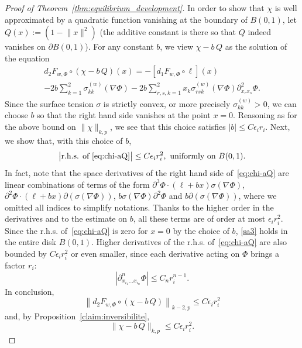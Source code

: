 \documentclass[AHL,Unicode,longabstracts,published]{cedram}
\newcommand{\norm}[1]{\lVert #1 \rVert}
\newcommand{\abs}[1]{\lvert #1 \rvert}
\newcommand{\eps}{\epsilon}
\begin{document}
\begin{proof}[Proof of Theorem~\ref{thm:equilibrium_development}]
In order to show that $\chi$ is well approximated by a quadratic function vanishing at the boundary of $B(0,1)$, let $Q(x) := (1 -
\norm{x}^2)$ (the additive constant is there so that $Q$ indeed vanishes on $\partial B(0,1)$). For any constant $b$, we view $\chi - b\, Q$ as the solution of the equation
\begin{multline}\label{eq:chi-aQ}
d_2 F_{w,\Phi}\circ(\chi - b\, Q)(x) = -\left[d_1 F_{w,\Phi}\circ \ell\right](x)
\\ -2b\sum_{k=1}^2\sigma^{(w)}_{kk}(\nabla\Phi) - 2b\sum_{r,s,k=1}^2x_k\sigma^{(w)}_{rsk}(\nabla\Phi)\partial^2_{x_r x_s} \Phi.
\end{multline}
Since the surface tension $\sigma$ is strictly convex, or more precisely $\sigma^{(w)}_{kk}>0$, we can choose $b$ so that the right hand side vanishes at the point $x=0$. Reasoning as for the above bound on $\norm{\chi}_{k,p}$, we see that this choice satisfies $\abs{b}
\leq C\epsilon_ir_i$. Next, we show that, with this choice of $b$,
\begin{equation}\label{sa3}
\text{\big|r.h.s. of~\eqref{eq:chi-aQ}}\big|\le C\epsilon_i r_i^2,
\text{ uniformly on } B(0,1).
\end{equation}
In fact, note that the space derivatives of the right hand side of~\eqref{eq:chi-aQ} are linear combinations of terms of the form $\partial^3 \Phi\cdot (\ell + b x)
\sigma(\nabla \Phi)$, $\partial^2 \Phi \cdot (\ell + b x)
\partial(\sigma(\nabla \Phi))$, $b\sigma(\nabla\Phi)\partial^2\Phi$ and $b\partial (\sigma(\nabla \Phi))$, where we omitted all indices to simplify notations. Thanks to the higher order in the derivatives and to the estimate on $b$, all these terms are of order at most $\eps_i r_i^2$. Since the r.h.s. of~\eqref{eq:chi-aQ} is zero for $x=0$ by the choice of $b$, \eqref{sa3} holds in the entire disk $B(0,1)$. Higher derivatives of the r.h.s. of~\eqref{eq:chi-aQ} are also bounded by $C \epsilon_i r_i^2$ or even smaller, since each derivative acting on $\Phi$ brings a factor $r_i$:
\begin{equation}\label{higherderiv}
\left|\partial^{n}_{x_{i_1}\dots x_{i_n}}\Phi\right|\le C_n r_i^{n-1}.
\end{equation}
In conclusion,
\begin{equation}
\left\| d_2 F_{w,\Phi}\circ(\chi - b\,Q)\right\|_{k-2,p}\le C \epsilon_i r_i^2
\end{equation}
and, by Proposition~\ref{claim:inversibilite},
\begin{equation}\label{frigo}
\|\chi - b\,Q\|_{k,p}\le C \epsilon_i r_i^2.
\end{equation}


\end{proof}
\end{document}

